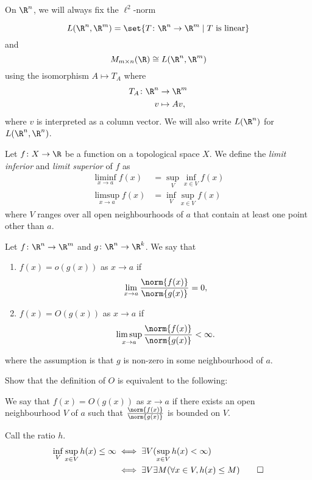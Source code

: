 On $\R^n$, we will always fix the $\ell^2$-norm

\begin{notation}
    \[
        L(\R^n, \R^m) = \set{T\colon \R^n \to \R^m \mid T \text{ is linear}}
    \] and \[
        M_{m \times n}(\R) \cong L(\R^n, \R^m)
    \] using the isomorphism $A \mapsto T_A$ where \begin{align*}
    T_A\colon \R^n &\to \R^m \\
          v &\mapsto Av,
    \end{align*} where $v$ is interpreted as a column vector.
    We will also write $L(\R^n)$ for $L(\R^n, \R^n)$.
\end{notation}

\begin{definition} \label{def:liminf-limsup}
    Let $f\colon X \to \R$ be a function on a topological space $X$.
    We define the \emph{limit inferior} and \emph{limit superior} of $f$ as
    \begin{align*}
        \liminf_{x \to a} f(x) &= \sup_V \inf_{x \in V} f(x) \\
        \limsup_{x \to a} f(x) &= \inf_V \sup_{x \in V} f(x)
    \end{align*} where $V$ ranges over all open neighbourhoods of $a$
    that contain at least one point other than $a$.
\end{definition}

\begin{definition*}[$O$ notation] \label{def:o}
    Let $f\colon \R^n \to \R^m$ and $g\colon \R^n \to \R^k$.
    We say that
    \begin{enumerate}
        \item $f(x) = o(g(x))$ as $x \to a$ if \[
            \lim_{x \to a} \frac{\norm{f(x)}}{\norm{g(x)}} = 0,
        \]
        \item $f(x) = O(g(x))$ as $x \to a$ if \[
            \limsup_{x \to a} \frac{\norm{f(x)}}{\norm{g(x)}} < \infty.
        \]
    \end{enumerate}
    where the assumption is that $g$ is non-zero in some
    neighbourhood of $a$.
\end{definition*}

\begin{exercise}
    Show that the definition of $O$ is equivalent to the following:

    We say that $f(x) = O(g(x))$ as $x \to a$ if there exists an open
    neighbourhood $V$ of $a$ such that $\frac{\norm{f(x)}}{\norm{g(x)}}$
    is bounded on $V$.
\end{exercise}
\begin{solution}
    Call the ratio $h$.
    \begin{align*}
        \inf_V \sup_{x \in V} h(x) \le \infty
            &\iff \exists V (\sup_{x \in V} h(x) < \infty) \\
            &\iff \exists V \exists M (\forall x \in V, h(x) \le M) \qedhere
    \end{align*}
\end{solution}

